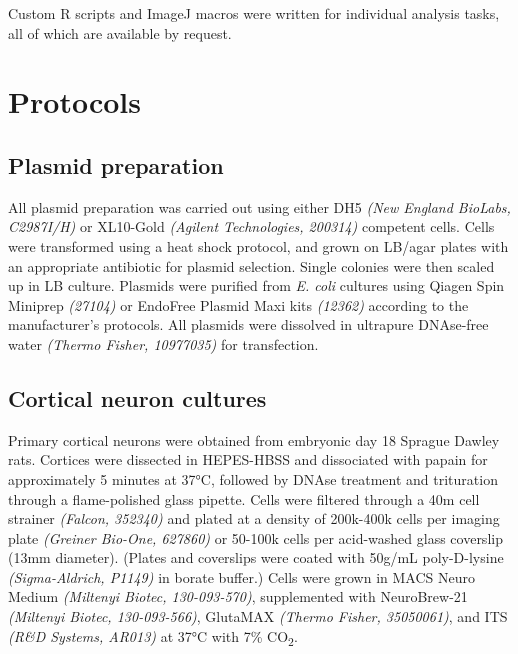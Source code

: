 \documentclass[
  12pt,
  a4paper,
]{book}
\begin{document}
Custom R scripts and ImageJ macros were written for individual analysis tasks, all of which are available by request.

\hypertarget{protocols}{%
\section{Protocols}\label{protocols}}

\hypertarget{plasmid-prep}{%
\subsection{Plasmid preparation}\label{plasmid-prep}}

All plasmid preparation was carried out using either DH5\textalpha{} \emph{(New England BioLabs, C2987I/H)} or XL10-Gold \emph{(Agilent Technologies, 200314)} competent cells. Cells were transformed using a heat shock protocol, and grown on LB/agar plates with an appropriate antibiotic for plasmid selection. Single colonies were then scaled up in LB culture. Plasmids were purified from \emph{E. coli} cultures using Qiagen Spin Miniprep \emph{(27104)} or EndoFree Plasmid Maxi kits \emph{(12362)} according to the manufacturer's protocols. All plasmids were dissolved in ultrapure DNAse-free water \emph{(Thermo Fisher, 10977035)} for transfection.

\hypertarget{cortical-neuron-cultures}{%
\subsection{Cortical neuron cultures}\label{cortical-neuron-cultures}}

Primary cortical neurons were obtained from embryonic day 18 Sprague Dawley rats. Cortices were dissected in HEPES-HBSS and dissociated with papain for approximately 5 minutes at 37°C, followed by DNAse treatment and trituration through a flame-polished glass pipette. Cells were filtered through a 40\textmu{}m cell strainer \emph{(Falcon, 352340)} and plated at a density of 200k-400k cells per imaging plate \emph{(Greiner Bio-One, 627860)} or 50-100k cells per acid-washed glass coverslip (13mm diameter). (Plates and coverslips were coated with 50\textmu{}g/mL poly-D-lysine \emph{(Sigma-Aldrich, P1149)} in borate buffer.) Cells were grown in MACS Neuro Medium \emph{(Miltenyi Biotec, 130-093-570)}, supplemented with NeuroBrew-21 \emph{(Miltenyi Biotec, 130-093-566)}, GlutaMAX \emph{(Thermo Fisher, 35050061)}, and ITS \emph{(R\&D Systems, AR013)} at 37°C with 7\% CO\textsubscript{2}.
\end{document}
